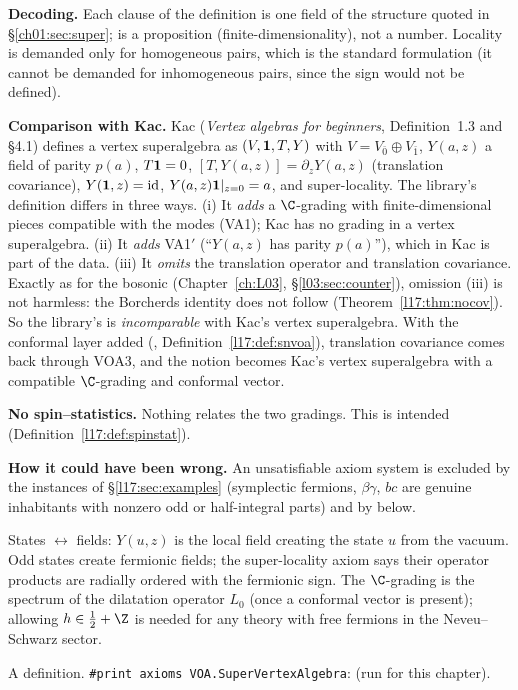 \begin{dictionary}
\textbf{Decoding.} Each clause of the definition is one field of the structure quoted in
§\ref{ch01:sec:super};  is a proposition (finite-dimensionality), not a number. Locality
is demanded only for homogeneous pairs, which is the standard formulation (it cannot be demanded for
inhomogeneous pairs, since the sign would not be defined).

\textbf{Comparison with Kac.} Kac (\emph{Vertex algebras for beginners}, Definition~1.3 and §4.1)
defines a vertex superalgebra as $(V,\mathbf{1},T,Y)$ with $V=V_{\bar0}\oplus V_{\bar1}$, $Y(a,z)$ a
field of parity $p(a)$, $T\mathbf{1}=0$, $[T,Y(a,z)]=\partial_zY(a,z)$ (translation covariance),
$Y(\mathbf{1},z)=\mathrm{id}$, $Y(a,z)\mathbf{1}|_{z=0}=a$, and super-locality. The library's
definition differs in three ways. (i) It \emph{adds} a $\C$-grading with finite-dimensional pieces
compatible with the modes (VA1); Kac has no grading in a vertex superalgebra. (ii) It \emph{adds}
VA1$'$ (``$Y(a,z)$ has parity $p(a)$''), which in Kac is part of the data. (iii) It \emph{omits} the
translation operator and translation covariance. Exactly as for the bosonic 
(Chapter~\ref{ch:L03}, §\ref{l03:sec:counter}), omission (iii) is not harmless: the Borcherds identity
does not follow (Theorem~\ref{l17:thm:nocov}). So the library's  is
\emph{incomparable} with Kac's vertex superalgebra. With the conformal layer added
(, Definition~\ref{l17:def:snvoa}), translation covariance comes back through
VOA3, and the notion becomes Kac's vertex superalgebra with a compatible $\C$-grading and conformal
vector.

\textbf{No spin--statistics.} Nothing relates the two gradings. This is intended
(Definition~\ref{l17:def:spinstat}).

\textbf{How it could have been wrong.} An unsatisfiable axiom system is excluded by the instances of
§\ref{l17:sec:examples} (symplectic fermions, $\beta\gamma$, $bc$ are genuine inhabitants with
nonzero odd or half-integral parts) and by  below.
\end{dictionary}
\begin{physics}
States $\leftrightarrow$ fields: $Y(u,z)$ is the local field creating the state $u$ from the vacuum.
Odd states create fermionic fields; the super-locality axiom says their operator products are
radially ordered with the fermionic sign. The $\C$-grading is the spectrum of the dilatation operator
$L_0$ (once a conformal vector is present); allowing $h\in\frac12+\Z$ is needed for any theory with
free fermions in the Neveu--Schwarz sector.
\end{physics}
\begin{status}
A definition. \texttt{\#print axioms VOA.SuperVertexAlgebra}:  (run for this chapter).
\end{status}

